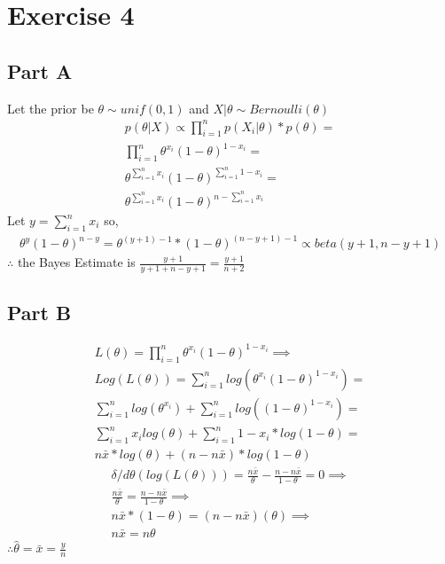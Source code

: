 \documentclass{article}\usepackage[]{graphicx}\usepackage[]{color}
\begin{document}
\section*{Exercise 4}
\subsection*{Part A}
Let the prior be $\theta \sim unif(0,1)$ and $X|\theta \sim Bernoulli(\theta)$
\begin{equation}
\begin{split}
p(\theta|X) \propto \prod_{i=1}^{n} p(X_{i}|\theta) * p(\theta) = \\
\prod_{i=1}^{n} \theta^{x_i}(1-\theta)^{1-x_i} = \\
\theta^{\sum_{i=1}^{n}x_i}(1-\theta)^{\sum_{i=1}^{n}1-x_i} = \\
\theta^{\sum_{i=1}^{n}x_i}(1-\theta)^{n-\sum_{i=1}^{n}x_i}
\end{split}
\end{equation}
Let $y = \sum_{i=1}^{n}x_i$ so,
\begin{equation}
\begin{split}
\theta^{y}(1-\theta)^{n-y} = \theta^{(y+1)-1}*(1-\theta)^{(n-y+1)-1}\propto beta(y+1, n-y+1)
\end{split}
\end{equation}
$\therefore$ the Bayes Estimate is $\frac{y+1}{y+1+n-y+1}=\frac{y+1}{n+2}$
\subsection*{Part B}
\begin{equation}
\begin{split}
L(\theta) =\prod_{i=1}^{n} \theta^{x_i}(1-\theta)^{1-x_i} \implies \\
Log(L(\theta)) = \sum_{i=1}^{n} log(\theta^{x_i}(1-\theta)^{1-x_i}) = \\
\sum_{i=1}^{n} log(\theta^{x_i}) + \sum_{i=1}^{n} log((1-\theta)^{1-x_i}) = \\
\sum_{i=1}^{n} x_i log(\theta) + \sum_{i=1}^{n} {1-x_i} * log(1-\theta) = \\
n\bar{x}*log(\theta) + (n-n\bar{x})* log(1-\theta)
\end{split}
\end{equation}
\begin{equation}
\begin{split}
\delta/d\theta(log(L(\theta))) = \frac{n\bar{x}}{\theta} - \frac{n-n\bar{x}}{1-\theta} = 0 \implies \\
\frac{n\bar{x}}{\theta} = \frac{n-n\bar{x}}{1-\theta} \implies \\ 
n\bar{x}*(1-\theta) = (n-n\bar{x})(\theta) \implies \\
n\bar{x} = n\theta
\end{split}
\end{equation}
$\therefore \hat{\theta}=\bar{x} = \frac{y}{n}$
\end{document}
